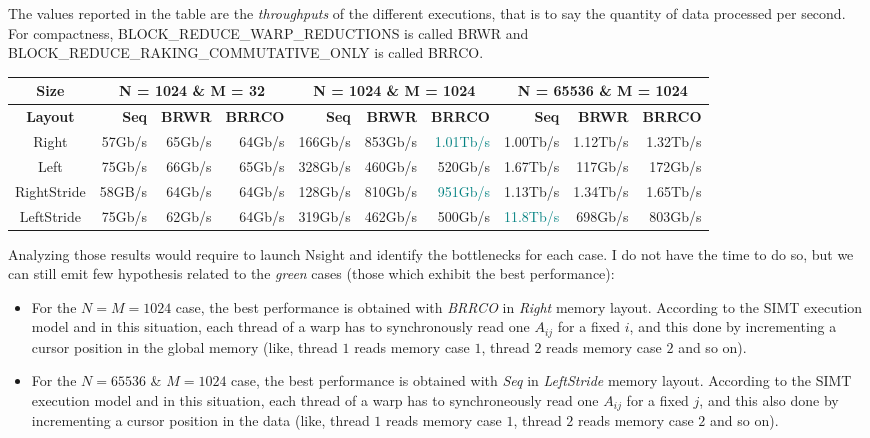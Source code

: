 \documentclass{article}
\begin{document}
The values reported in the table are the \textit{throughputs} of the different executions, that is to say the quantity of data processed per second. For compactness, BLOCK\_REDUCE\_WARP\_REDUCTIONS is called BRWR and BLOCK\_REDUCE\_RAKING\_COMMUTATIVE\_ONLY is called BRRCO.

\small
\begin{center}
\begin{tabular}{c|r|r|r|r|r|r|r|r|r }
	\textbf{Size} & \multicolumn{3}{c|}{\textbf{N = 1024} \& \textbf{M = 32}} & \multicolumn{3}{c|}{\textbf{N = 1024} \& \textbf{M = 1024}} & \multicolumn{3}{c|}{\textbf{N = 65536} \& \textbf{M = 1024}} \\ 
\hline
	\textbf{Layout} & \textbf{Seq} & \textbf{BRWR} & \textbf{BRRCO} & \textbf{Seq} & \textbf{BRWR} & \textbf{BRRCO} & \textbf{Seq} & \textbf{BRWR} & \textbf{BRRCO} \\
  \hline		
	Right & 57Gb/s & 65Gb/s & 64Gb/s & 166Gb/s & 853Gb/s & \textcolor{teal}{1.01Tb/s} & 1.00Tb/s & 1.12Tb/s & 1.32Tb/s  \\
	Left & 75Gb/s & 66Gb/s & 65Gb/s & 328Gb/s & 460Gb/s & 520Gb/s & 1.67Tb/s & 117Gb/s & 172Gb/s \\
	RightStride & 58GB/s & 64Gb/s & 64Gb/s & 128Gb/s & 810Gb/s & \textcolor{teal}{951Gb/s} & 1.13Tb/s & 1.34Tb/s & 1.65Tb/s \\
	LeftStride & 75Gb/s & 62Gb/s & 64Gb/s & 319Gb/s & 462Gb/s & 500Gb/s & \textcolor{teal}{11.8Tb/s} & 698Gb/s & 803Gb/s \\
\end{tabular}
\end{center}
\normalsize

Analyzing those results would require to launch Nsight and identify the bottlenecks for each case. I do not have the time to do so, but we can still emit few hypothesis related to the \textit{green} cases (those which exhibit the best performance):

\begin{itemize}
	\item For the $N=M=1024$ case, the best performance is obtained with \textit{BRRCO} in \textit{Right} memory layout. According to the SIMT execution model and in this situation, each thread of a warp has to synchronously read one $A_{ij}$ for a fixed $i$, and this done by incrementing a cursor position in the global memory (like, thread $1$ reads memory case $1$, thread $2$ reads memory case $2$ and so on).
	\item For the $N=65536$ \& $M=1024$ case, the best performance is obtained with \textit{Seq} in \textit{LeftStride} memory layout. According to the SIMT execution model and in this situation, each thread of a warp has to synchroneously read one $A_{ij}$ for a fixed $j$, and this also done by incrementing a cursor position in the data (like, thread $1$ reads memory case $1$, thread $2$ reads memory case $2$ and so on).
\end{itemize}
\end{document}
